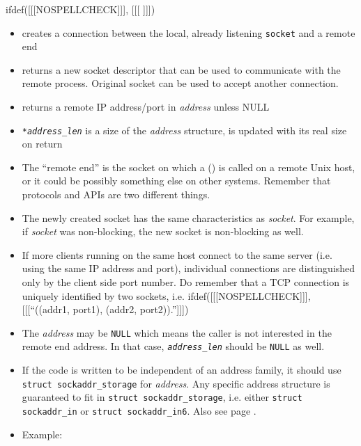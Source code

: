 
\begin{slide}
ifdef([[[NOSPELLCHECK]]], [[[
]]])
\begin{itemize}
\item creates a connection between the local, already listening \texttt{socket}
and a remote end
\item returns a new socket descriptor that can be used to communicate with the
remote process.  Original socket can be used to accept another connection.
\item returns a remote IP address/port in \emph{address} unless NULL
\item \emph{\texttt{*address\_len}} is a size of the \emph{address} structure,
is updated with its real size on return
\end{itemize}
\end{slide}

\label{ACCEPT}

\begin{itemize}
\item The ``remote end'' is the socket on which a () is
called on a remote Unix host, or it could be possibly something else on other
systems.  Remember that protocols and APIs are two different things.
\item The newly created socket has the same characteristics as \emph{socket}.
For example, if \emph{socket} was non-blocking, the new socket is non-blocking
as well.
\item If more clients running on the same host connect to the same server (i.e.
using the same IP address and port), individual connections are distinguished
only by the client side port number.  Do remember that a TCP connection is
uniquely identified by two sockets, i.e.
ifdef([[[NOSPELLCHECK]]], [[[``((addr1, port1), (addr2, port2)).'']]])
\item The \emph{address} may be \texttt{NULL} which means the caller is not
interested in the remote end address. In that case,
\emph{\texttt{address\_len}} should be \texttt{NULL} as well.
\item If the code is written to be independent of an address family, it should
use \texttt{struct sockaddr\_storage} for \emph{address}.  Any specific address
structure is guaranteed to fit in \texttt{struct sockaddr\_storage}, i.e. either
\texttt{struct sockaddr\_in} or \texttt{struct sockaddr\_in6}.  Also see page
\pageref{TCPCLNTEXAMPLE}.
\item \label{TCP_SINK_SERVER_C} Example: 
\end{itemize}

